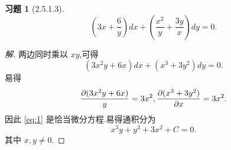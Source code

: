 \documentclass[a4paper, 12pt]{article} %
\newtheorem*{cdtheorem}{习题}
\newenvironment{exercise}
{\bigskip\begin{mdframed}[backgroundcolor=gray!40,rightline=false,leftline=false,topline=false,bottomline=false]\begin{cdtheorem}}
    {\end{cdtheorem}\end{mdframed}\bigskip}
\begin{document}
\begin{exercise}[2.5.1.3]
$$
(3x+\frac{6}{y})dx+(\frac{x^2}{y}+\frac{3y}{x})dy=0.
$$
\end{exercise}
\begin{proof}[解]
两边同时乘以 $xy$,可得
\begin{equation}
  \label{eq:1}
  (3x^2y+6x)dx+(x^3+3y^2)dy=0.
\end{equation}
易得
$$
\frac{\partial (3x^2y+6x)}{y}=3x^2,\frac{\partial (x^3+3y^2)}{\partial x}=3x^2.
$$
因此 \eqref{eq:1} 是恰当微分方程.易得通积分为
$$
x^3y+y^3+3x^{2}+C=0.
$$
其中 $x,y\neq 0$.
\begin{comment}
先分组,得到微分方程
\begin{equation}
  \label{eq:1}
  3xdx+\frac{x^2}{y}dy=0.
\end{equation}
可得积分因子为 $\frac{1}{x^2}$,乘以积分因子后得到微分方程
$$
\frac{3}{x}dx+\frac{1}{y}dy=0.
$$
可得通积分为
$$
3\ln |x|+\ln |y|+C=0,
$$
即
$$
\ln |x|^3|y|=-C.
$$
易得 $\frac{1}{x^2}g(|x|^{3}|y|)$ 也是微分方程 \eqref{eq:1} 的积分因子,其
中 $g$ 是可微函数.我们还有微分方程
\begin{equation}
  \label{eq:2}
  \frac{6}{y}dx+\frac{3y}{x}dy=0,
\end{equation}
可得积分因子为 $xy$,乘以积分因子后得到微分方程
$$
6xdx+3y^2dy=0.
$$
可得通积分为
$$
3x^2+\frac{3}{2}y^2+C=0.
$$
易得 $xyh(2x^2+y^2)$ 也是微分方程 \eqref{eq:2} 的积分因子,其中 $h$ 是
可微函数.我们希望,
$$
\frac{1}{x^2}g(|x|^3|y|)=xyh(2x^2+y^2).
$$
令
$$
g(|x|^3|y|)=|x|^3|y|,h(2x^2+y^2)=\frac{|xy|}{xy}.
$$
\end{comment}
\begin{comment}
两边同时乘以非零的函数 $u(x,y)$,得到
$$
u(x,y)(3x+\frac{6}{y})dx+u(x,y)(\frac{x^2}{y}+\frac{3y}{x})dy=0.
$$
我们希望这是一个恰当微分方程,即
$$
\frac{\pa [u(x,y)(3x+\frac{6}{y})]}{\pa y}=\frac{\pa [u(x,y)(\frac{x^2}{y}+\frac{3y}{x})]}{dx}.
$$
也即
$$
\frac{\pa u}{\pa y}(3x+\frac{6}{y})-6u \frac{1}{y^2}=\frac{\pa u}{\pa x}(\frac{x^2}{y}+\frac{3y}{x})+u(\frac{2x}{y}-\frac{3y}{x^2}).
$$
\end{comment}
\end{proof}





\end{document}
